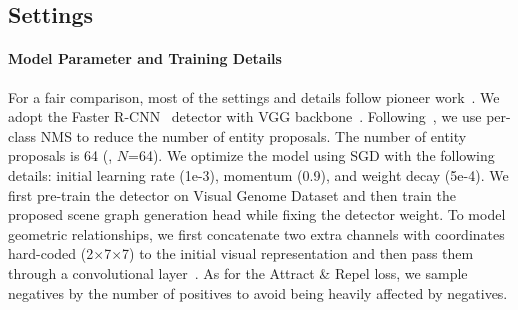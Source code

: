     \subsection{Settings}
    \label{section:setting}
        \paragraph{Model Parameter and Training Details}
            For a fair comparison, most of the settings and details follow pioneer work~\cite{xu2017scene, zellers2018neural}.
            We adopt the Faster R-CNN~\cite{ren2015faster} detector with VGG backbone~\cite{simonyan2014very}.
            Following~\cite{zellers2018neural}, we use per-class NMS to reduce the number of entity proposals. The number of entity proposals is 64 (\ie, $N$=64).
            We optimize the model using SGD with the following details: initial learning rate (1e-3), momentum (0.9), and weight decay (5e-4).
            We first pre-train the detector on Visual Genome Dataset and then train the proposed scene graph generation head while fixing the detector weight.
            To model geometric relationships, we first concatenate two extra channels with coordinates hard-coded (2$\times$7$\times$7) to the initial visual representation and then pass them through a convolutional layer~\cite{liu2018intriguing}. As for the Attract \& Repel loss, we sample negatives by the number of positives to avoid being heavily affected by negatives.
        
